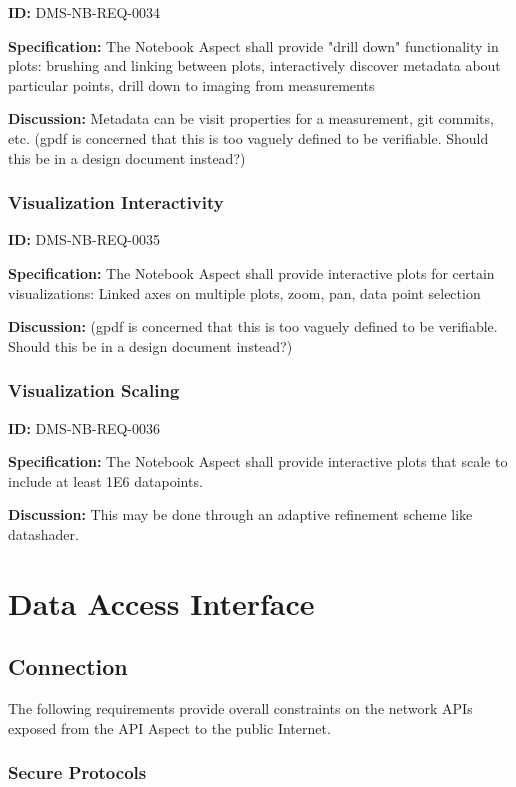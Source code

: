 \documentclass[SE,toc,lsstdraft]{lsstdoc}
\begin{document}
\label{DMS-NB-REQ-0034}
\textbf{ID:} DMS-NB-REQ-0034

\textbf{Specification:}
The Notebook Aspect shall provide "drill down" functionality in plots: brushing and linking between plots, interactively discover metadata about particular points, drill down to imaging from measurements

\textbf{Discussion:}
Metadata can be visit properties for a measurement, git commits, etc. (gpdf is concerned that this is too vaguely defined to be verifiable.  Should this be in a design document instead?)

\subsubsection{Visualization Interactivity}

\label{DMS-NB-REQ-0035}
\textbf{ID:} DMS-NB-REQ-0035

\textbf{Specification:}
The Notebook Aspect shall provide interactive plots for certain visualizations:
Linked axes on multiple plots, zoom, pan, data point selection

\textbf{Discussion:}
(gpdf is concerned that this is too vaguely defined to be verifiable.  Should this be in a design document instead?)

\subsubsection{Visualization Scaling}

\label{DMS-NB-REQ-0036}
\textbf{ID:} DMS-NB-REQ-0036

\textbf{Specification:}
The Notebook Aspect shall provide interactive plots that scale to include at least 1E6 datapoints.

\textbf{Discussion:}
This may be done through an adaptive refinement scheme like datashader.

\section{Data Access Interface}

\subsection{Connection}

The following requirements provide overall constraints on the network APIs exposed from the API Aspect to the public Internet.

\subsubsection{Secure Protocols}
\end{document}
